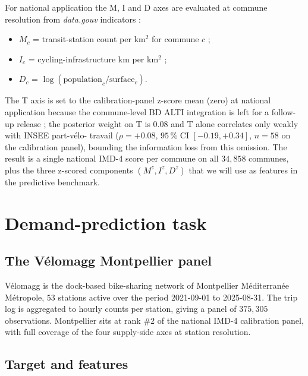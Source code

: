 \documentclass[11pt,a4paper]{article}
\begin{document}
For national application the M, I and D axes are evaluated at
commune resolution from \emph{data.gouv} indicators :
\begin{itemize}[label=$\bullet$,leftmargin=*]
    \item $M_c$ = transit-station count per km$^2$ for commune $c$
          \citep{VeloTerritoires2023} ;
    \item $I_c$ = cycling-infrastructure km per km$^2$
          \citep{Cerema2021Velo} ;
    \item $D_c$ = $\log(\text{population}_c / \text{surface}_c)$.
\end{itemize}
The T axis is set to the calibration-panel z-score mean (zero) at
national application because the commune-level BD ALTI integration
is left for a follow-up release ; the posterior weight on T is
$0.08$ and T alone correlates only weakly with INSEE part-v\'elo-
travail ($\rho = +0.08$, $95\,\%$ CI $[-0.19, +0.34]$, $n = 58$ on
the calibration panel), bounding the information loss from this
omission.  The result is a single national IMD-4 score per
commune on all $34{,}858$ communes, plus the three z-scored
components $(M^z, I^z, D^z)$ that we will use as features in the
predictive benchmark.

\section{Demand-prediction task}
\label{sec:task}

\subsection{The V\'elomagg Montpellier panel}

V\'elomagg is the dock-based bike-sharing network of Montpellier
M\'editerran\'ee M\'etropole, $53$ stations active over the
period 2021-09-01 to 2025-08-31.  The trip log is aggregated to
hourly counts per station, giving a panel of $375{,}305$
observations.  Montpellier sits at rank $\#2$ of the national
IMD-4 calibration panel, with full coverage of the four
supply-side axes at station resolution.

\subsection{Target and features}
\end{document}
